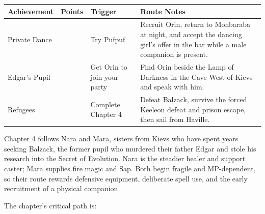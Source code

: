\documentclass[
  american,
  10pt,
  letterpaper,
  oneside,
  open=any]{scrreprt}
\newcounter{none} %
\newenvironment{guidetable}{%
  \small\setstretch{1.0}%
  \setlength{\tabcolsep}{4pt}%
  \setlength{\LTpre}{8pt}\setlength{\LTpost}{10pt}%
  \renewcommand{\arraystretch}{1.16}%
}{ }
\begin{document}
\begin{guidetable}

{\def\LTcaptype{none} %
\begin{longtable}[]{@{}
  >{\raggedright\arraybackslash}p{}
  >{\raggedleft\arraybackslash}p{}
  >{\raggedright\arraybackslash}p{}
  >{\raggedright\arraybackslash}p{}@{}}
\toprule\noalign{}
\begin{minipage}[b]{\linewidth}\raggedright
\color{GuideGreen}\bfseries Achievement
\end{minipage} & \begin{minipage}[b]{\linewidth}\raggedleft
\color{GuideGreen}\bfseries Points
\end{minipage} & \begin{minipage}[b]{\linewidth}\raggedright
\color{GuideGreen}\bfseries Trigger
\end{minipage} & \begin{minipage}[b]{\linewidth}\raggedright
\color{GuideGreen}\bfseries Route Notes
\end{minipage} \\
\midrule\noalign{}
\endhead
\bottomrule\noalign{}
\endlastfoot
Private Dance & 5 & Try Pufpuf & Recruit Orin, return to Monbaraba at
night, and accept the dancing girl's offer in the bar while a male
companion is present. \\
Edgar's Pupil & 5 & Get Orin to join your party & Find Orin beside the
Lamp of Darkness in the Cave West of Kievs and speak with him. \\
Refugees & 10 & Complete Chapter 4 & Defeat Balzack, survive the forced
Keeleon defeat and prison escape, then sail from Haville. \\
\end{longtable}
}

\end{guidetable}

Chapter 4 follows Nara and Mara, sisters from Kievs who have spent years
seeking Balzack, the former pupil who murdered their father Edgar and
stole his research into the Secret of Evolution. Nara is the steadier
healer and support caster; Mara supplies fire magic and Sap. Both begin
fragile and MP-dependent, so their route rewards defensive equipment,
deliberate spell use, and the early recruitment of a physical companion.

The chapter's critical path is:
\end{document}
